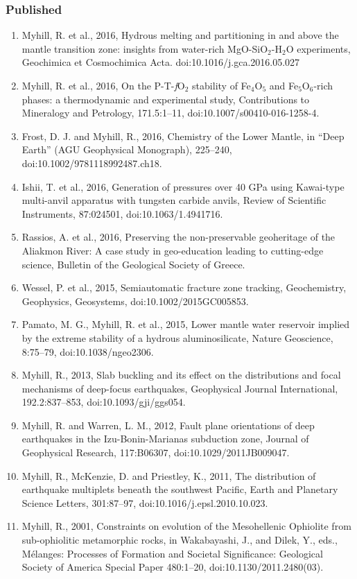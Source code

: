 \documentclass[11pt,twoside,a4paper]{article}
\begin{document}
\subsubsection*{Published}
\begin{enumerate}
\item Myhill, R. et al., 2016, Hydrous melting and partitioning in and above the mantle transition zone: insights from water-rich MgO-SiO$_2$-H$_2$O experiments, Geochimica et Cosmochimica Acta. doi:10.1016/j.gca.2016.05.027
\item Myhill, R. et al., 2016, On the P-T-\emph{f}O$_2$ stability of Fe$_4$O$_5$ and Fe$_5$O$_6$-rich phases: a thermodynamic and experimental study, Contributions to Mineralogy and Petrology, 171.5:1--11, doi:10.1007/s00410-016-1258-4.
 \item Frost, D. J. and Myhill, R., 2016, Chemistry of the Lower Mantle, in ``Deep Earth'' (AGU Geophysical Monograph), 225--240, doi:10.1002/9781118992487.ch18.
 \item Ishii, T. et al., 2016, Generation of pressures over 40 GPa using Kawai-type multi-anvil apparatus with tungsten carbide anvils, Review of Scientific Instruments, 87:024501, doi:10.1063/1.4941716.
 \item Rassios, A. et al., 2016, Preserving the non-preservable geoheritage of the Aliakmon River: A case study in geo-education leading to cutting-edge science, Bulletin of the Geological Society of Greece.
\item  Wessel, P. et al., 2015, Semiautomatic fracture zone tracking, Geochemistry, Geophysics, Geosystems, doi:10.1002/2015GC005853. 
\item Pamato, M. G., Myhill, R. et al., 2015, Lower mantle water reservoir implied by the extreme stability of a hydrous aluminosilicate, Nature Geoscience, 8:75--79, doi:10.1038/ngeo2306.
\item Myhill, R., 2013, Slab buckling and its effect on the distributions and focal mechanisms of deep-focus earthquakes, Geophysical Journal International, 192.2:837--853, doi:10.1093/gji/ggs054.
\item Myhill, R. and Warren, L. M., 2012, Fault plane orientations of deep earthquakes in the Izu-Bonin-Marianas subduction zone, Journal of Geophysical Research, 117:B06307, doi:10.1029/2011JB009047.
\item Myhill, R., McKenzie, D. and Priestley, K., 2011, The distribution of earthquake multiplets beneath the southwest Pacific, Earth and Planetary Science Letters, 301:87--97, doi:10.1016/j.epsl.2010.10.023.
\item Myhill, R., 2001, Constraints on evolution of the Mesohellenic Ophiolite from sub-ophiolitic metamorphic rocks, in Wakabayashi, J., and Dilek, Y., eds., M\'elanges: Processes of Formation and Societal Significance: Geological Society of America Special Paper 480:1--20, doi:10.1130/2011.2480(03).
\end{enumerate}
\end{document}
